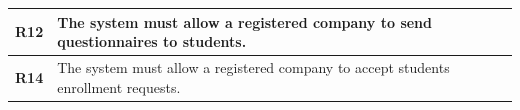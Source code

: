 \begin{table}[H]
\begin{tabular}{|l|m{10cm}|}
        \hline \textbf{R12} & The system must allow a registered company to send questionnaires to students. \\
        \hline \textbf{R14} & The system must allow a registered company to accept students enrollment requests. \\
        \hline
    \end{tabular}
\end{table}

